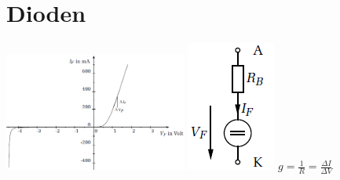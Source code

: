\section{Dioden}

\includegraphics[width=6cm]{bilder/DiodenKennlinie}
\includegraphics{bilder/DiodenKleinsignal}
$g = \frac{1}{R}= \frac{\Delta I}{\Delta V}$\\
